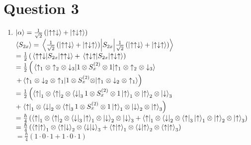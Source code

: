 \documentclass[12pt]{article}
\begin{document}
\section*{Question 3}
\begin{enumerate}[label=\alph*)]
\item
$\ket{\alpha} = \frac{1}{\sqrt{2}}\left(\ket{\uparrow\uparrow\downarrow} + \ket{\uparrow\downarrow\uparrow}\right)$\vspace{0.5em}\\
$\ev{S_{2x}} = \ev{S_{2x}}{\frac{1}{\sqrt{2}}\left(\ket{\uparrow\uparrow\downarrow} + \ket{\uparrow\downarrow\uparrow}\right)}$\vspace{0.5em}\\
\hspace*{2.1em} $=\frac{1}{2}\left(\ev{S_{2x}}{\uparrow\uparrow\downarrow} + \ev{S_{2x}}{\uparrow\downarrow\uparrow}\right)$\vspace{0.5em}\\
\hspace*{2.1em} $= \frac{1}{2}\left( \ev{1\otimes S_x^{(2)}\otimes 1}{\uparrow_1 \otimes \uparrow_2 \otimes \downarrow_3} \right.$\vspace{0.5em}\\
\hspace*{4.1em} $\left. + \ev{1 \otimes S_x^{(2)}\otimes}{\uparrow_1 \otimes \downarrow_2 \otimes \uparrow_1}\right)$\vspace{0.5em}\\
\hspace*{2.1em} $= \frac{1}{2}\left(\bra{\uparrow}_1 \otimes \bra{\uparrow}_2 \otimes \bra{\downarrow}_3 1 \otimes S_x^{(2)} \otimes 1 \ket{\uparrow}_1 \otimes \ket{\uparrow}_2 \otimes \ket{\downarrow}_3\right.$\vspace{0.5em}\\
\hspace*{4.1em} $+ \left.\bra{\uparrow}_1 \otimes \bra{\downarrow}_2 \otimes \bra{\uparrow}_3 1 \otimes S_x^{(2)} \otimes 1 \ket{\uparrow}_1 \otimes \ket{\downarrow}_2 \otimes \ket{\uparrow}_3\right) $\vspace{0.5em}\\
\hspace*{2.1em} $= \frac{\hbar}{4}\left(\bra{\uparrow}_1 \otimes \bra{\uparrow}_2 \otimes \bra{\downarrow}_3 \ket{\uparrow}_1 \otimes \ket{\downarrow}_2 \otimes \ket{\downarrow}_3 + \bra{\uparrow}_1 \otimes \bra{\downarrow}_2 \otimes \bra{\uparrow}_3 \ket{\uparrow}_1 \otimes \ket{\uparrow}_2 \otimes \ket{\uparrow}_3\right)$\vspace{0.5em}\\
\hspace*{2.1em} $ = \frac{\hbar}{4}\left(\braket{\uparrow}{\uparrow}_1 \otimes \braket{\uparrow}{\downarrow}_2 \otimes \braket{\downarrow}{\downarrow}_3 + \braket{\uparrow}{\uparrow}_1 \otimes \braket{\downarrow}{\uparrow}_2 \otimes \braket{\uparrow}{\uparrow}_3\right)$\vspace{0.5em}\\
\hspace*{2.1em} $ = \frac{\hbar}{4}\left(1\cdot 0\cdot 1 + 1\cdot 0 \cdot 1\right)$\vspace{0.5em}


\end{enumerate}
\end{document}
